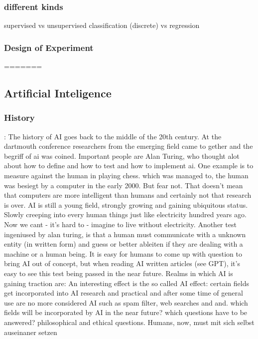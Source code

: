 \subsubsection{different kinds} 
supervised vs unsupervised
classification (discrete) vs regression
\subsubsection{Design of Experiment}
=======
\subsection{Artificial Inteligence}
\subsubsection{History}

: The history of AI goes back to the middle of the 20th century. At the dartmouth conference researchers from the emerging field came to gether and the begriff of ai was coined. Important people are Alan Turing, who thought alot about how to define and how to test and how to implement ai. One example is to measure against the human in playing chess. which was managed to, the human was besiegt by a computer in the early 2000. But fear not. That doesn't mean that computers are more intelligent than humans and certainly not that research is over. AI is still a young field, strongly growing and gaining ubiquitous status. Slowly creeping into every human things just like electricity hundred years ago. Now we cant - it's hard to - imagine to live without electricity. Another test ingeniused by alan turing, is that a human must communicate with a unknown entity (in written form) and guess or better ableiten if they are dealing with a machine or a human being. It is easy for humans to come up with question to bring AI out of concept, but when reading AI written articles (see GPT), it's easy to see this test being passed in the near future. 
Realms in which AI is gaining traction are: 
An interesting effect is the so called AI effect: certain fields get incorporated into AI research and practical and after some time of general use are no more considered AI such as spam filter, web searches and and. 
which fields will be incorporated by AI in the near future? 
which questions have to be answered? philosophical and ethical questions. 
Humans, now, must mit sich selbst auseinaner setzen 

